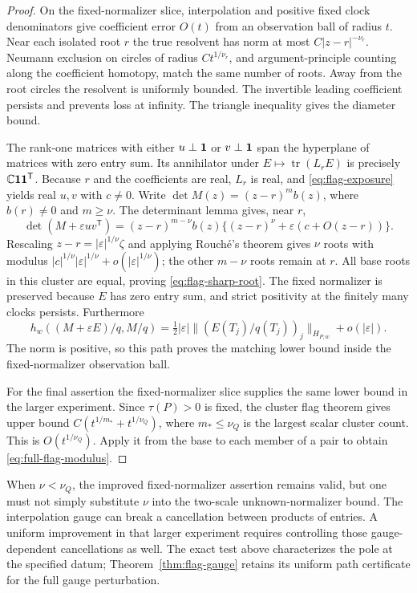 \begin{proof}
On the fixed-normalizer slice, interpolation and positive fixed
clock denominators give coefficient error $O(t)$ from an observation
ball of radius $t$. Near each isolated root $r$ the true resolvent
has norm at most $C|z-r|^{-\nu_r}$. Neumann exclusion on circles of
radius $Ct^{1/\nu_r}$, and argument-principle counting along the
coefficient homotopy, match the same number of roots. Away from the
root circles the resolvent is uniformly bounded. The invertible
leading coefficient persists and prevents loss at infinity. The
triangle inequality gives the diameter bound.

The rank-one matrices with either $u\perp\mathbf 1$ or $v\perp\mathbf 1$
span the hyperplane of matrices with zero entry sum. Its annihilator
under $E\mapsto\operatorname{tr}(L_rE)$ is precisely
$\mathbb C\mathbf 1\mathbf 1^{\mathsf T}$. Because $r$ and the coefficients are real,
$L_r$ is real, and \eqref{eq:flag-exposure} yields real $u,v$ with
$c\ne0$. Write $\det M(z)=(z-r)^m b(z)$, where $b(r)\ne0$ and
$m\ge\nu$. The determinant lemma gives, near $r$,
\[
 \det(M+\varepsilon uv^{\mathsf T})
  =(z-r)^{m-\nu}b(z)
       \{(z-r)^\nu+\varepsilon(c+O(z-r))\}.
\]
Rescaling $z-r=|\varepsilon|^{1/\nu}\zeta$ and applying Rouch\'e's
theorem gives $\nu$ roots with modulus
$|c|^{1/\nu}|\varepsilon|^{1/\nu}+o(|\varepsilon|^{1/\nu})$;
the other $m-\nu$ roots remain at $r$. All base roots in this cluster
are equal, proving \eqref{eq:flag-sharp-root}. The fixed normalizer
is preserved because $E$ has zero entry sum, and strict positivity
at the finitely many clocks persists. Furthermore
\[
 h_w((M+\varepsilon E)/q,M/q)
   =\tfrac12|\varepsilon|\|(E(T_j)/q(T_j))_j\|_{H_{P,w}}
                                           +o(|\varepsilon|).
\]
The norm is positive, so this path proves the matching lower bound
inside the fixed-normalizer observation ball.

For the final assertion the fixed-normalizer slice supplies the same
lower bound in the larger experiment. Since $\tau(P)>0$ is fixed,
the cluster flag theorem gives upper bound
$C(t^{1/m_*}+t^{1/\nu_Q})$, where $m_*\le\nu_Q$ is the largest
scalar cluster count. This is $O(t^{1/\nu_Q})$. Apply it from the base
to each member of a pair to obtain \eqref{eq:full-flag-modulus}.
\end{proof}

When $\nu<\nu_Q$, the improved fixed-normalizer assertion remains
valid, but one must not simply substitute $\nu$ into the two-scale
unknown-normalizer bound. The interpolation gauge can break a
cancellation between products of entries. A uniform improvement in
that larger experiment requires controlling those gauge-dependent
cancellations as well. The exact test above characterizes the pole
at the specified datum; Theorem~\ref{thm:flag-gauge} retains its
uniform path certificate for the full gauge perturbation.


